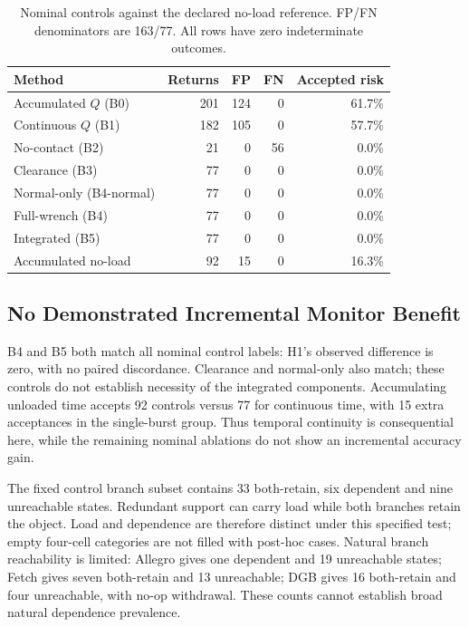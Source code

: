 \documentclass[conference,10pt,letterpaper]{IEEEtran}
\begin{document}
\begin{table}[t]
\caption{Nominal controls against the declared no-load reference. FP/FN
denominators are 163/77. All rows have zero indeterminate outcomes.}
\label{tab:controls}\centering\footnotesize
\setlength{\tabcolsep}{4pt}
\begin{tabular}{lrrrr}
\toprule
Method & Returns & FP & FN & Accepted risk\\
\midrule
Accumulated $Q$ (B0) & 201 & 124 & 0 & 61.7\%\\
Continuous $Q$ (B1) & 182 & 105 & 0 & 57.7\%\\
No-contact (B2) & 21 & 0 & 56 & 0.0\%\\
Clearance (B3) & 77 & 0 & 0 & 0.0\%\\
Normal-only (B4-normal) & 77 & 0 & 0 & 0.0\%\\
Full-wrench (B4) & 77 & 0 & 0 & 0.0\%\\
Integrated (B5) & 77 & 0 & 0 & 0.0\%\\
Accumulated no-load & 92 & 15 & 0 & 16.3\%\\
\bottomrule
\end{tabular}
\end{table}

\subsection{No Demonstrated Incremental Monitor Benefit}
B4 and B5 both match all nominal control labels: H1's observed difference is
zero, with no paired discordance. Clearance and normal-only also match;
these controls do not establish necessity of the integrated components.
Accumulating unloaded time accepts 92 controls versus 77 for continuous time,
with 15 extra acceptances in the single-burst group. Thus temporal continuity
is consequential here, while the remaining nominal ablations do not show an
incremental accuracy gain.

The fixed control branch subset contains 33 both-retain, six dependent and
nine unreachable states. Redundant support can carry load while both branches
retain the object. Load and dependence are therefore distinct under this
specified test; empty four-cell categories are not filled with post-hoc cases.
Natural branch reachability is limited: Allegro gives one dependent and 19
unreachable states; Fetch gives seven both-retain and 13 unreachable; DGB
gives 16 both-retain and four unreachable, with no-op withdrawal. These counts
cannot establish broad natural dependence prevalence.
\end{document}
